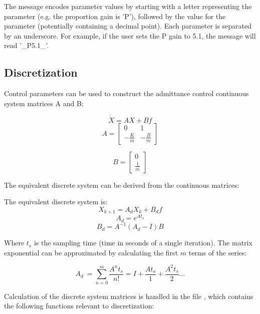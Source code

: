 \documentclass{article}
\begin{document}
	The message encodes parameter values by starting with a letter representing the parameter (e.g. the proportion gain is 'P'), followed by the value for the parameter (potentially containing a decimal point). Each parameter is separated by an underscore. For example, if the user sets the P gain to 5.1, the message will read '\_P5.1\_'.
	
	\subsection{Discretization}
	
	Control parameters can be used to construct the admittance control continuous system matrices A and B: 
	
	\begin{equation}
	\dot{X} = AX + Bf
	\end{equation}
	\[
		A=
		\begin{bmatrix}
			0 & 1 \\
			-\frac{K}{m} & -\frac{B}{m}
		\end{bmatrix}
	\]
	
	\[
		B=
		\begin{bmatrix}
			0 \\
			\frac{1}{m}
		\end{bmatrix}
	\]
	
	The equivalent discrete system can be derived from the continuous matrices:	
	
	The equivalent discrete system is:
	\begin{equation}
	X_{k+1} = A_dX_k + B_df
	\end{equation}
	\begin{equation}
	A_d = e^{At_s}
	\end{equation}
	\begin{equation} \label{eqn:bd}
	B_d = A^{-1}(A_d - I)B
	\end{equation}
	
	Where $t_s$ is the sampling time (time in seconds of a single iteration). The matrix exponential can be approximated by calculating the first $m$ terms of the series:
	
	\begin{equation} \label{eqn:matrix_exp}
	A_d ~= \sum_{n=0}^{m} \frac{A^nt_s}{n!} = I + \frac{At_s}{1} + \frac{{A}^2t_s}{2} ... 
	\end{equation}
	
	Calculation of the discrete system matrices is handled in the file , which contains the following functions relevant to discretization:
	
\end{document}
